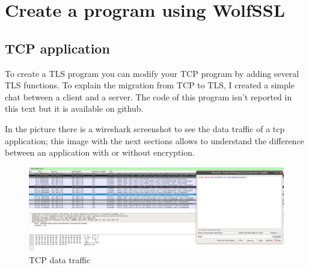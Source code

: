 \documentclass[a4paper,12pt]{article}
\begin{document}

\section{Create a program using WolfSSL}
\subsection{TCP application}
To create a TLS program you can modify your TCP program by adding several TLS functions. To explain the migration from TCP to TLS, I created a simple chat between a client and a server. The code of this program isn't reported in this text but it is available on github.

In the picture there is a wireshark screenshot to see the data traffic of a tcp application; this image with the next sections allows to understand the difference between an application with or without encryption.

\begin{figure}[H]
    \centering
    \includegraphics[scale=0.23]{./code/tcp/img/test.png}
    \caption{TCP data traffic}
    
\end{figure}
\end{document}
